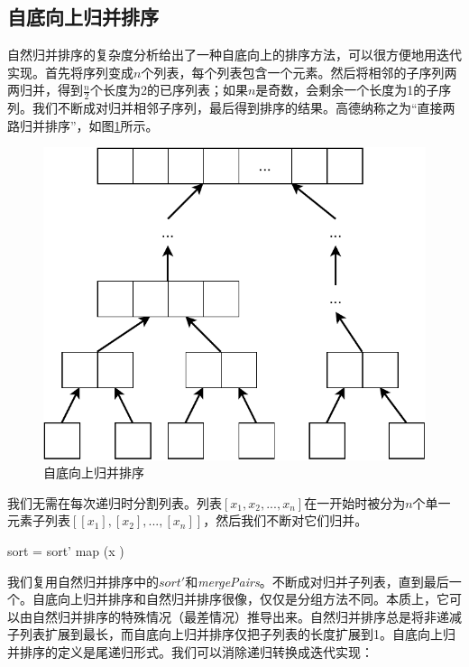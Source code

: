 \documentclass[b5paper]{ctexart}
\begin{document}
\subsection{自底向上归并排序}

自然归并排序的复杂度分析给出了一种自底向上的排序方法，可以很方便地用迭代实现。首先将序列变成$n$个列表，每个列表包含一个元素。然后将相邻的子序列两两归并，得到$\frac{n}{2}$个长度为2的已序列表；如果$n$是奇数，会剩余一个长度为1的子序列。我们不断成对归并相邻子序列，最后得到排序的结果。高德纳称之为“直接两路归并排序”\cite{TAOCP}，如图\cref{fig:bottom-up-msort}所示。

\begin{figure}[htbp]
 \centering
 \includegraphics[scale=0.6]{img/bottom-up-msort}
 \caption{自底向上归并排序}
 \label{fig:bottom-up-msort}
\end{figure}

我们无需在每次递归时分割列表。列表$[x_1, x_2, ..., x_n]$在一开始时被分为$n$个单一元素子列表$[[x_1], [x_2], ..., [x_n]]$，然后我们不断对它们归并。

\be
sort = sort' \circ map (x \mapsto [x])
\ee

我们复用自然归并排序中的$sort'$和\textit{mergePairs}。不断成对归并子列表，直到最后一个\cite{okasaki-book}。自底向上归并排序和自然归并排序很像，仅仅是分组方法不同。本质上，它可以由自然归并排序的特殊情况（最差情况）推导出来。自然归并排序总是将非递减子列表扩展到最长，而自底向上归并排序仅把子列表的长度扩展到1。自底向上归并排序的定义是尾递归形式。我们可以消除递归转换成迭代实现：
\end{document}
